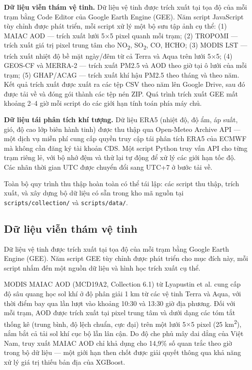 \textbf{Dữ liệu viễn thám vệ tinh.} Dữ liệu vệ tinh được trích xuất tại tọa độ của mỗi trạm bằng Code Editor của Google Earth Engine (GEE). Năm script JavaScript tùy chỉnh được phát triển, mỗi script xử lý một bộ sưu tập ảnh cụ thể: (1) MAIAC AOD --- trích xuất lưới 5$\times$5 pixel quanh mỗi trạm; (2) TROPOMI --- trích xuất giá trị pixel trung tâm cho NO\textsubscript{2}, SO\textsubscript{2}, CO, HCHO; (3) MODIS LST --- trích xuất nhiệt độ bề mặt ngày/đêm từ cả Terra và Aqua trên lưới 5$\times$5; (4) GEOS-CF và MERRA-2 --- trích xuất PM2.5 và AOD theo giờ tại ô lưới của mỗi trạm; (5) GHAP/ACAG --- trích xuất khí hậu PM2.5 theo tháng và theo năm. Kết quả trích xuất được xuất ra các tệp CSV theo năm lên Google Drive, sau đó được tải về và đóng gói thành các tệp nén ZIP. Quá trình trích xuất GEE mất khoảng 2--4 giờ mỗi script do các giới hạn tính toán phía máy chủ.

\textbf{Dữ liệu tái phân tích khí tượng.} Dữ liệu ERA5 (nhiệt độ, độ ẩm, áp suất, gió, độ cao lớp biên hành tinh) được thu thập qua Open-Meteo Archive API --- một dịch vụ miễn phí cung cấp quyền truy cập tái phân tích ERA5 của ECMWF mà không cần đăng ký tài khoản CDS. Một script Python truy vấn API cho từng trạm riêng lẻ, với bộ nhớ đệm và thử lại tự động để xử lý các giới hạn tốc độ. Các nhãn thời gian UTC được chuyển đổi sang UTC+7 ở bước tải về.

Toàn bộ quy trình thu thập hoàn toàn có thể tái lập: các script thu thập, trích xuất, và xây dựng bộ dữ liệu có sẵn trong kho mã nguồn tại \texttt{scripts/collection/} và \texttt{scripts/data/}.

\subsection{Dữ liệu viễn thám vệ tinh}

Dữ liệu vệ tinh được trích xuất tại tọa độ của mỗi trạm bằng Google Earth Engine (GEE). Năm script GEE tùy chỉnh được phát triển cho mục đích này, mỗi script nhắm đến một nguồn dữ liệu và hình học trích xuất cụ thể.

MODIS MAIAC AOD (MCD19A2, Collection 6.1) từ Lyapustin et al. \cite{lyapustin2018} cung cấp độ sâu quang học sol khí ở độ phân giải 1 km từ các vệ tinh Terra và Aqua, với thời điểm bay qua lần lượt vào khoảng 10:30 và 13:30 giờ địa phương. Đối với mỗi trạm, AOD được trích xuất tại pixel trung tâm và dưới dạng các tóm tắt thống kê (trung bình, độ lệch chuẩn, cực đại) trên một lưới 5$\times$5 pixel (25 km\textsuperscript{2}), nắm bắt cả tải sol khí cục bộ lẫn lân cận. Do độ che phủ mây dai dẳng của Việt Nam, truy xuất MAIAC AOD chỉ khả dụng cho 14,9\% số quan trắc theo giờ trong bộ dữ liệu --- một giới hạn then chốt được giải quyết thông qua khả năng xử lý giá trị thiếu bản địa của XGBoost.


